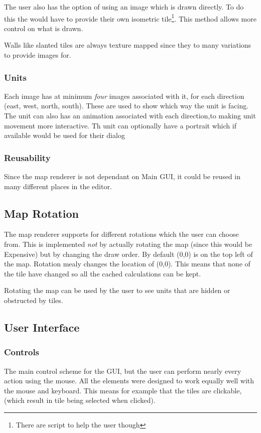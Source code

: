 The user also has the option of using an image which is drawn directly. To do this the would have to provide their own isometric tile\footnote{There are script to help the user though}. This method allows more control on what is drawn.  

Walls like slanted tiles are always texture mapped since they to many variations to provide images for. 

\subsubsection{Units}
Each image has at minimum \emph{four} images associated with it, for each direction (east, west, north, south). These are used to show which way the unit is facing. The unit can also has an animation associated with each direction,to making unit movement more interactive.  Th unit can optionally have a portrait which if available would be used for their dialog

\subsubsection{Reusability}
Since the map renderer is not dependant on Main GUI, it could be reused in many different places in the editor. 

\subsection{Map Rotation}
The map renderer supports for different rotations which the user can choose from. This is implemented \emph{not} by actually rotating the map (since this would be Expensive) but by changing the draw order. By default (0,0) is on the top left of the map. Rotation mealy changes the location of (0,0). This means that none of the tile have changed so all the cached calculations can be kept. 

Rotating the map can be used by the user to see units that are hidden or obstructed by tiles. 

\clearpage
\subsection{User Interface}
\subsubsection{Controls}
The main control scheme for the GUI, but the user can perform nearly every action using the mouse. All the elements were designed to work equally well with the mouse and keyboard. This means for example that the tiles are clickable, (which result in tile being selected when clicked).  

